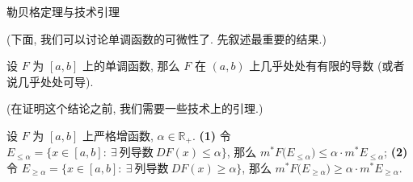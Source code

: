 \begin{frame}{勒贝格定理与技术引理}

(下面, 我们可以讨论单调函数的可微性了. 先叙述最重要的结果.)

\begin{thm}
设 $F$ 为 $[a, b]$ 上的单调函数, 那么 $F$ 在 $(a, b)$ 上\alert{几乎处处有有限的导数}
(或者说几乎处处可导).
\end{thm}

(在证明这个结论之前, 我们需要一些技术上的引理.)

\pause

\begin{lem}
设 $F$ 为 $[a, b]$ 上严格增函数, $\alpha \in \mathbb{R}_+$.
\textbf{(1)} 令
$E_{\leqslant \alpha} = \{ x \in [a, b]:\ \exists\ \text{列导数}\ D F(x) \leqslant \alpha \}$,
那么
$m^* F\big( E_{\leqslant \alpha} \big) \leqslant \alpha \cdot m^* E_{\leqslant \alpha}$;
\textbf{(2)} 令
$E_{\geqslant \alpha} = \{ x \in [a, b]:\ \exists\ \text{列导数}\ D F(x) \geqslant \alpha \}$,
那么
$m^* F\big( E_{\geqslant \alpha} \big) \geqslant \alpha \cdot m^* E_{\geqslant \alpha}$.
\end{lem}

\end{frame}


